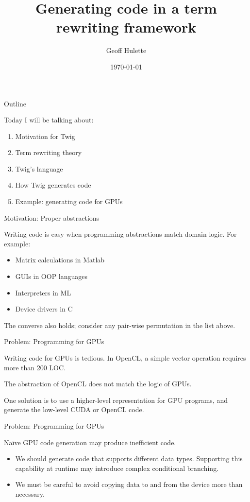 \documentclass{beamer}
\title{Generating code in a term rewriting framework}
\author{Geoff Hulette}
\date{\today}
\begin{document}
\begin{frame}[plain]
  \titlepage
\end{frame}

\begin{frame}{Outline}

Today I will be talking about:

\begin{enumerate}
  \item Motivation for Twig
  \item Term rewriting theory
  \item Twig's language
  \item How Twig generates code
  \item Example: generating code for GPUs
\end{enumerate}

\end{frame}


\begin{frame}{Motivation: Proper abstractions}

Writing code is easy when programming abstractions match domain logic. For
example:

\begin{itemize}
\item Matrix calculations in Matlab
\item GUIs in OOP languages
\item Interpreters in ML
\item Device drivers in C
\end{itemize}

The converse also holds; consider any pair-wise permutation in the list above.

\end{frame}


\begin{frame}{Problem: Programming for GPUs}

Writing code for GPUs is tedious. In OpenCL, a simple vector operation
requires more than 200 LOC. 

The abstraction of OpenCL does not match the logic of GPUs.

One solution is to use a higher-level representation for GPU programs, and
generate the low-level CUDA or OpenCL code.

\end{frame}

\begin{frame}{Problem: Programming for GPUs}

Na\"ive GPU code generation may produce inefficient code.

\begin{itemize}

\item We should generate code that supports different data types. Supporting
this capability at runtime may introduce complex conditional branching.

\item We must be careful to avoid copying data to and from the device more
than necessary.

\end{itemize}

\end{frame}
\end{document}
